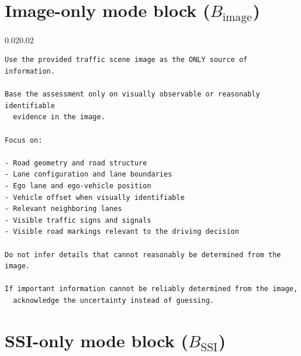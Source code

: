 \documentclass[12pt,a4paper]{report}
\begin{document}
\section{Image-only mode block (\texorpdfstring{$B_{\text{image}}$}{B_image})}

\begin{adjustwidth}{0.02\linewidth}{0.02\linewidth}
\begin{framed}
\footnotesize
\begin{verbatim}
Use the provided traffic scene image as the ONLY source of information.

Base the assessment only on visually observable or reasonably identifiable
  evidence in the image.

Focus on:

- Road geometry and road structure
- Lane configuration and lane boundaries
- Ego lane and ego-vehicle position
- Vehicle offset when visually identifiable
- Relevant neighboring lanes
- Visible traffic signs and signals
- Visible road markings relevant to the driving decision

Do not infer details that cannot reasonably be determined from the image.

If important information cannot be reliably determined from the image,
  acknowledge the uncertainty instead of guessing.
\end{verbatim}
\end{framed}
\end{adjustwidth}

\section{SSI-only mode block (\texorpdfstring{$B_{\text{SSI}}$}{B_SSI})}
\end{document}
